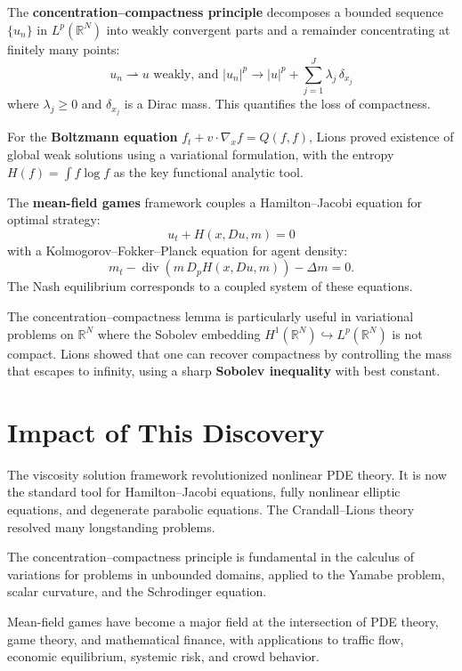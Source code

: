 The \textbf{concentration--compactness principle} decomposes a
bounded sequence $\{u_n\}$ in $L^p(\mathbb{R}^N)$ into weakly
convergent parts and a remainder concentrating at finitely many
points:
\[
  u_n \rightharpoonup u \text{ weakly, and }
  |u_n|^p \to |u|^p + \sum_{j=1}^{J} \lambda_j\,\delta_{x_j}
\]
where $\lambda_j\geq 0$ and $\delta_{x_j}$ is a Dirac mass.  This
quantifies the loss of compactness.

For the \textbf{Boltzmann equation}
$f_t + v \cdot \nabla_x f = Q(f,f)$, Lions proved existence of
global weak solutions using a variational formulation, with the
entropy $H(f) = \int f \log f$ as the key functional analytic
tool.

The \textbf{mean-field games} framework couples a Hamilton--Jacobi
equation for optimal strategy:
\[
  u_t + H(x, Du, m) = 0
\]
with a Kolmogorov--Fokker--Planck equation for agent density:
\[
  m_t - \operatorname{div}(m\,D_p H(x,Du,m)) - \Delta m = 0.
\]
The Nash equilibrium corresponds to a coupled system of these
equations.

The concentration--compactness lemma is particularly useful in
variational problems on $\mathbb{R}^N$ where the Sobolev embedding
$H^1(\mathbb{R}^N)\hookrightarrow L^p(\mathbb{R}^N)$ is not
compact.  Lions showed that one can recover compactness by
controlling the mass that escapes to infinity, using a sharp
\textbf{Sobolev inequality} with best constant.

\section{Impact of This Discovery}

The viscosity solution framework revolutionized nonlinear PDE
theory.  It is now the standard tool for Hamilton--Jacobi equations,
fully nonlinear elliptic equations, and degenerate parabolic
equations.  The Crandall--Lions theory resolved many longstanding
problems.

The concentration--compactness principle is fundamental in the
calculus of variations for problems in unbounded domains, applied to
the Yamabe problem, scalar curvature, and the Schrodinger equation.

Mean-field games have become a major field at the intersection of
PDE theory, game theory, and mathematical finance, with
applications to traffic flow, economic equilibrium, systemic risk,
and crowd behavior.


